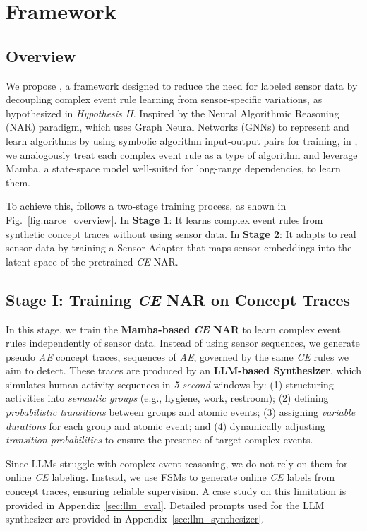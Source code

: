 \section{\narce{} Framework}
\subsection{Overview}
We propose \narce{}, a framework designed to reduce the need for labeled sensor data by decoupling complex event rule learning from sensor-specific variations, as hypothesized in \emph{Hypothesis II}. Inspired by the Neural Algorithmic Reasoning (NAR) paradigm, which uses Graph Neural Networks (GNNs) to represent and learn algorithms by using symbolic algorithm input-output pairs for training, in \narce{}, we analogously treat each complex event rule as a type of algorithm and leverage Mamba, a state-space model well-suited for long-range dependencies, to learn them.

To achieve this, \narce{} follows a two-stage training process, as shown in Fig.~\ref{fig:narce_overview}. In \textbf{Stage 1}: It learns complex event rules from synthetic concept traces without using sensor data. In \textbf{Stage 2}: It adapts to real sensor data by training a Sensor Adapter that maps sensor embeddings into the latent space of the pretrained \emph{CE} NAR.

\subsection{Stage I: Training \emph{CE} NAR on Concept Traces}
In this stage, we train the \textbf{Mamba-based \emph{CE} NAR} to learn complex event rules independently of sensor data. Instead of using sensor sequences, we generate pseudo \emph{AE} concept traces, sequences of \emph{AE}, governed by the same \emph{CE} rules we aim to detect. These traces are produced by an \textbf{LLM-based Synthesizer}, which simulates human activity sequences in \emph{5-second} windows by: (1) structuring activities into \emph{semantic groups} (e.g., hygiene, work, restroom); (2) defining \emph{probabilistic transitions} between groups and atomic events; (3) assigning \emph{variable durations} for each group and atomic event; and (4) dynamically adjusting \emph{transition probabilities} to ensure the presence of target complex events.

Since LLMs struggle with complex event reasoning, we do not rely on them for online \emph{CE} labeling. Instead, we use FSMs to generate online \emph{CE} labels from concept traces, ensuring reliable supervision. A case study on this limitation is provided in Appendix~\ref{sec:llm_eval}. Detailed prompts used for the LLM synthesizer are provided in Appendix~\ref{sec:llm_synthesizer}.

